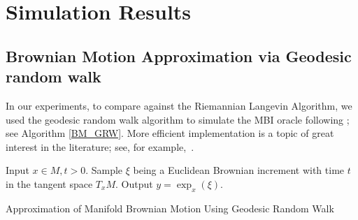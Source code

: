 \iffalse
\section{Additional Related Works}\label{relwork}



In \citep{altschuler2024faster}, maybe Theorem D.1 and Theorem 4.1 together give another implementation of RHK. \textcolor{blue}{This paper just discussed some implementation of RGO in Euclidean space. They proposed to use some kind of accelerated LMC, instead of rejection sampling.}


Constrained sampling 

HMC: 
\cite{kook2022sampling}, proposed Constrained Riemannian Hamiltonian Monte Carlo (CRHMC), and used Implicit Midpoint Method to integrate the Hamiltonian dynamics. They claimed a complexity $\mathcal{O}(mn^{3}\log\frac{\Lambda}{\varepsilon})$ for discretized CRHMC. 

\cite{kook2023condition} considered discretized RHMC on a class of numerical integrators (including implicit midpoint method and generalized Leapfrog method), and proved $\mathcal{O}(m \eta^{-2}\log\frac{\Lambda}{\varepsilon})$ convergence rate (with $\eta$ denote step size).


\cite{noble2023unbiased}. It seems that no complexity result is given. This work claimed the work \cite{kook2022sampling} has mistakes.

``proximal": Based on the idea of proximal sampler \cite{lee2021structured} and \cite{chen2022improved}, \cite{kook2024and} proposed an ``In-and-Out" sampling algorithm that can produce uniform samples in a convex body $\mathcal{K} \subseteq \mathbb{R}^{d}$.
\fi
\clearpage


\section{Simulation Results}\label{sec:sim}

\subsection{Brownian Motion Approximation via Geodesic random walk}\label{georw}


In our experiments, to compare against the Riemannian Langevin Algorithm, we used the geodesic random walk algorithm to simulate the MBI oracle following \cite{cheng2022efficient, de2022riemannian,schwarz2023efficient}; see Algorithm \ref{BM_GRW}. More efficient implementation is a topic of great interest in the literature; see, for example,~\citep{schwarz2023efficient}. 
\begin{algorithm}[H]
    \begin{algorithmic}
    \STATE Input $x \in M, t > 0$.
    \STATE Sample $\xi$ being a Euclidean Brownian increment with time $t$ in the tangent space $T_{x}M$.
    \STATE Output $y = \exp_{x}(\xi)$.
    \end{algorithmic}
    \caption{Approximation of Manifold Brownian Motion Using Geodesic Random Walk} 
    \label{BM_GRW} 
\end{algorithm}

